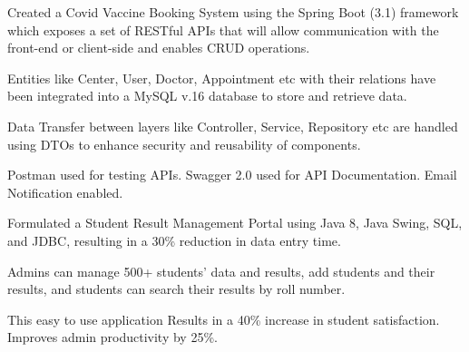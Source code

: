 \documentclass[]{deedy-resume-openfont}
\begin{document}
\begin{minipage}[t]{0.66\textwidth}

\begin{tightemize}

\item Created a Covid Vaccine Booking System using the Spring Boot (3.1) framework which exposes a set of RESTful APIs that will allow communication with the front-end or client-side and enables CRUD operations.

\item Entities like Center, User, Doctor, Appointment etc with their relations have been integrated into a MySQL v.16 database to store and retrieve data.

\item Data Transfer between layers like Controller, Service, Repository etc are handled using DTOs to enhance security and reusability of components. 
\item Postman used for testing APIs. Swagger 2.0 used for API Documentation. Email Notification enabled.
\end{tightemize}
\sectionsep


\begin{tightemize}
\item Formulated a Student Result Management Portal using Java 8, Java Swing, SQL, and JDBC, resulting in a 30\% reduction in data entry time. 
\item Admins can manage 500+ students' data and results, add students and their results, and students can search their results by roll number.
\item This easy to use application Results in a 40\% increase in student satisfaction. Improves admin productivity by 25\%.
\end{tightemize}
\sectionsep


\end{minipage}
\end{document}
